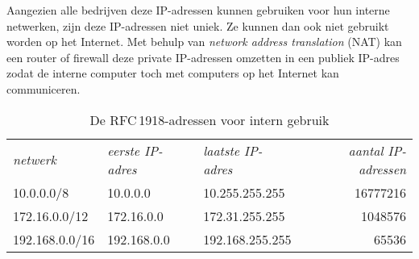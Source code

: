 Aangezien alle bedrijven deze IP-adressen kunnen gebruiken voor hun interne netwerken, zijn deze IP-adressen niet uniek.
Ze kunnen dan ook niet gebruikt worden op het Internet.
Met behulp van \emph{network address translation} (NAT) kan een router of firewall deze private IP-adressen omzetten in een publiek IP-adres zodat de interne computer toch met computers op het Internet kan communiceren.


\begin{table}[htp]
   \centering
   \begin{tabular}{lllr}
   \textit{netwerk}  & \textit{eerste IP-adres} & \textit{laatste IP-adres} & \textit{aantal IP-adressen}\\[1ex]
   10.0.0.0/8        & 10.0.0.0                 & 10.255.255.255            & \num{16777216} \\
   172.16.0.0/12     & 172.16.0.0               & 172.31.255.255            & \num{1048576}  \\
   192.168.0.0/16    & 192.168.0.0              & 192.168.255.255           & \num{65536}    \\
   \end{tabular}
   \caption{De RFC\,1918-adressen voor intern gebruik}
   \label{tab:rfc1918}
\end{table}


